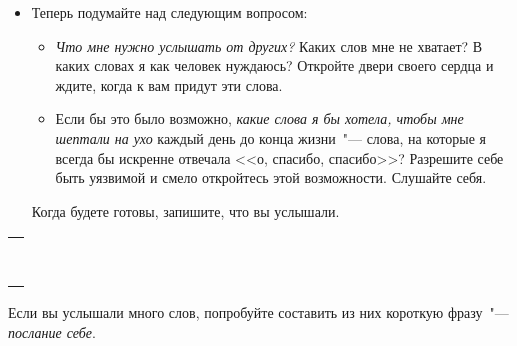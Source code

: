 \newpage
{}
\begin{itemize}
	\item Теперь подумайте над следующим вопросом:
	
	\begin{itemize}
		\item \emph{Что мне нужно услышать от других?} Каких слов мне не хватает? В каких словах я как человек нуждаюсь? Откройте двери своего сердца и ждите, когда к вам придут эти слова.
		
		\item Если бы это было возможно, \emph{какие слова я бы хотела, чтобы мне шептали на ухо} каждый день до конца жизни~"--- слова, на которые я всегда бы искренне отвечала <<о, спасибо, спасибо>>? Разрешите себе быть уязвимой и смело откройтесь этой возможности. Слушайте себя.
	\end{itemize}

	\itemWritingHand Когда будете готовы, запишите, что вы услышали.
\end{itemize}

\setlength{\extrarowheight}{2mm}
\begin{tabularx}{0.96\textwidth}{X}
	\\
	\arrayrulecolor{gray}\hline\\
	\hline\\
	\hline\\
	\hline\\
	\hline\\
	\hline\\
	\hline\\
	\hline\\
	\hline\\
\end{tabularx}
\setlength{\extrarowheight}{0mm}
\begin{itemize}
	\itemWritingHand Если вы услышали много слов, попробуйте составить из них короткую фразу~"--- \emph{послание себе}. 
\end{itemize}


